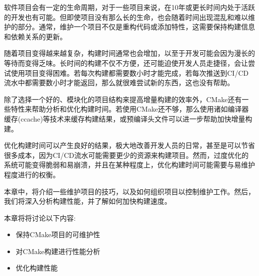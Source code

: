软件项目会有一定的生命周期，对于一些项目来说，在10年或更长时间内处于活跃的开发也有可能。但即使项目没有那么长的生命，也会随着时间出现混乱和难以维护的部分。通常，维护一个项目不仅是重构代码或添加特性，这需要保持构建信息和依赖关系的更新。

随着项目变得越来越复杂，构建时间通常也会增加，以至于开发可能会因为漫长的等待而变得乏味。长时间的构建不仅不方便，还可能迫使开发人员走捷径，会让尝试使用项目变得困难。若每次构建都需要数小时才能完成，若每次推送到CI/CD流水中都需要数小时才能返回，那么就很难尝试新的东西，这也没有帮助。

除了选择一个好的、模块化的项目结构来提高增量构建的效率外，CMake还有一些特性来帮助分析和优化构建时间。若使用CMake还不够，那么使用诸如编译器缓存(ccache)等技术来缓存构建结果，或预编译头文件可以进一步帮助加快增量构建。

优化构建时间可以产生良好的结果，极大地改善开发人员的日常，甚至是可以节省很多成本，因为CI/CD流水可能需要更少的资源来构建项目。然而，过度优化的系统可能变得脆弱和易崩溃，并且在某种程度上，优化构建时间可能需要与易维护程度进行的权衡。

本章中，将介绍一些维护项目的技巧，以及如何组织项目以控制维护工作。然后，我们将深入分析构建性能，并了解如何加快构建速度。

本章将将讨论以下内容:

\begin{itemize}
\item 
保持CMake项目的可维护性

\item 
对CMake构建进行性能分析

\item 
优化构建性能
\end{itemize}